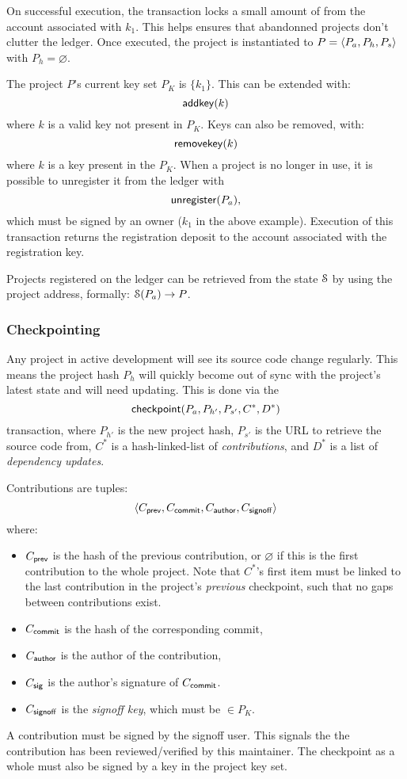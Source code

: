 On successful execution, the transaction locks a small amount of \oscoin{} from
the account associated with $k_1$. This helps ensures that abandonned projects
don't clutter the ledger.  Once executed, the project is instantiated to $P =
\langle P_a, P_h, P_s\rangle$ with $P_h = \varnothing$.

The project $P$'s current key set $P_K$ is $\{k_1\}$. This can be extended
with:
\[
    \mathsf{addkey}\lparen k\rparen
\]
where $k$ is a valid key not present in $P_K$. Keys can also be removed, with:
\[
    \mathsf{removekey}\lparen k\rparen
\]
where $k$ is a key present in the $P_K$.
When a project is no longer in use, it is possible to unregister it from the
ledger with
\[
    \mathsf{unregister}\lparen P_a\rparen,
\]
which must be signed by an owner ($k_1$ in the above example).
Execution of this transaction returns the registration deposit to the account
associated with the registration key.

Projects registered on the ledger can be retrieved from the state $\mathcal{S}$ by
using the project address, formally: $\mathcal{S}(P_a) \to P$.

\subsubsection{Checkpointing} \label{s:checkpointing} Any project in active
development will see its source code change regularly. This means the project
hash $P_h$ will quickly become out of sync with the project's latest state and
will need updating. This is done via the
\[
    \mathsf{checkpoint}\lparen P_a, P_{h'}, P_{s'}, C^*, D^*\rparen
\]
transaction, where $P_{h'}$ is the new project hash, $P_{s'}$ is the URL to
retrieve the source code from, $C^*$ is a hash-linked-list of
\emph{contributions}, and $D^*$ is a list of \emph{dependency updates}.

Contributions are tuples:
\[
   \langle C_{\mathsf{prev}}, C_{\mathsf{commit}}, C_{\mathsf{author}}, C_{\mathsf{signoff}}\rangle
\]
where:
\begin{itemize}
\item $C_{\mathsf{prev}}$ is the hash of the previous contribution, or
  $\varnothing$ if this is the first contribution to the whole
  project. Note that $C^*$'s first item must be linked to the last
  contribution in the project's \emph{previous} checkpoint, such that no
  gaps between contributions exist.
\item $C_{\mathsf{commit}}$ is the hash of the corresponding commit,
\item $C_{\mathsf{author}}$ is the author of the contribution,
\item $C_{\mathsf{sig}}$ is the author's signature of $C_{\mathsf{commit}}$.
\item $C_{\mathsf{signoff}}$ is the \emph{signoff key}, which must be $\in P_K$.
\end{itemize}
A contribution must be signed by the signoff user. This signals the
the contribution has been reviewed/verified by this maintainer. The
checkpoint as a whole must also be signed by a key in the project key set.

